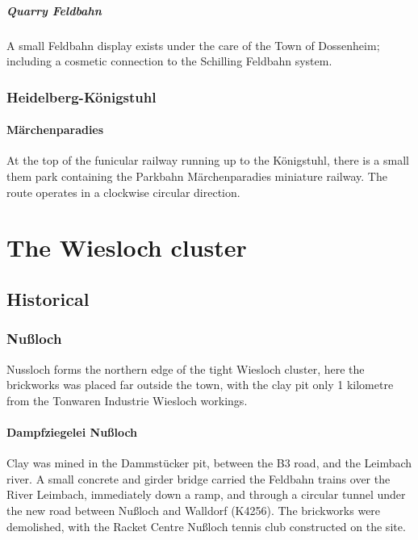 \documentclass[a4paper]{report}
\begin{document}
\subsubsection{Quarry Feldbahn}

A small Feldbahn display exists under the care of the Town of
Dossenheim; including a cosmetic connection to the Schilling Feldbahn system.

\section{Heidelberg-Königstuhl}

\subsection{Märchenparadies}

At the top of the funicular railway running up to the Königstuhl,
there is a small them park containing the Parkbahn Märchenparadies
miniature railway.  The route operates in a clockwise circular
direction.

\part{The Wiesloch cluster}

\chapter{Historical}

\section{Nußloch}

Nussloch forms the northern edge of the tight Wiesloch cluster, here
the brickworks was placed far outside the town, with the clay pit only
1 kilometre from the Tonwaren Industrie Wiesloch workings.

\subsection{Dampfziegelei Nußloch}

Clay was mined in the Dammstücker pit, between the B3 road, and the
Leimbach river.  A small concrete and girder bridge carried the
Feldbahn trains over the River Leimbach, immediately down a ramp, and
through a circular tunnel under the new road between Nußloch and Walldorf
(K4256).  The brickworks were demolished, with the Racket Centre Nußloch
tennis club constructed on the site.
\end{document}
